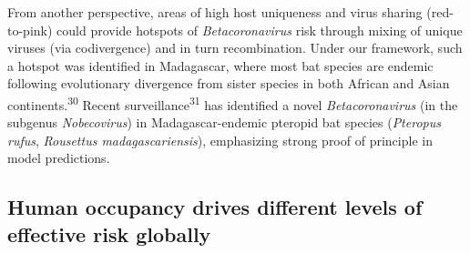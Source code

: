 \documentclass[11pt]{article}
\begin{document}
From another perspective, areas of high host uniqueness and virus
sharing (red-to-pink) could provide hotspots of \emph{Betacoronavirus}
risk through mixing of unique viruses (via codivergence) and in turn
recombination. Under our framework, such a hotspot was identified in
Madagascar, where most bat species are endemic following evolutionary
divergence from sister species in both African and Asian
continents.\textsuperscript{30} Recent surveillance\textsuperscript{31}
has identified a novel \emph{Betacoronavirus} (in the subgenus
\emph{Nobecovirus}) in Madagascar-endemic pteropid bat species
(\emph{Pteropus rufus}, \emph{Rousettus madagascariensis}), emphasizing
strong proof of principle in model predictions.

\hypertarget{human-occupancy-drives-different-levels-of-effective-risk-globally}{%
\subsection{Human occupancy drives different levels of effective risk
globally}\label{human-occupancy-drives-different-levels-of-effective-risk-globally}}
\end{document}
